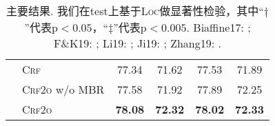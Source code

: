 \begin{table}[tb!]
\begin{tabular}{llcccc}
                                 & \textsc{Crf}           & 77.34                   & 71.62                    & 77.53\rlap{$^\ddagger$}          & 71.89\rlap{$^\ddagger$}          \\
                                 & \textsc{Crf2o} w/o MBR & 77.58                   & 71.92                    & 77.89                            & 72.25                            \\
                                 & \textsc{Crf2o}         & \textbf{78.08}          & \textbf{72.32}           & \textbf{78.02}\rlap{$^\ddagger$} & \textbf{72.33}\rlap{$^\ddagger$} \\
        \bottomrule
    \end{tabular}
    \caption{主要结果. 我们在test上基于\textsc{Loc}做显著性检验，其中``$\dagger$''代表$\mathrm{p} < 0.05$，``$\ddagger$''代表$\mathrm{p} < 0.005$.
        Biaffine17: \cite{Timothy-d17-biaffine}; F\&K19: \cite{falenska-kuhn-2019-non};
        Li19: \cite{li-etal-2019-attentive}; Ji19: \cite{ji-etal-2019-graph};
        Zhang19: \cite{zhang-etal-2019-empirical}.
    }
    \label{table:dev-test}
\end{table}


